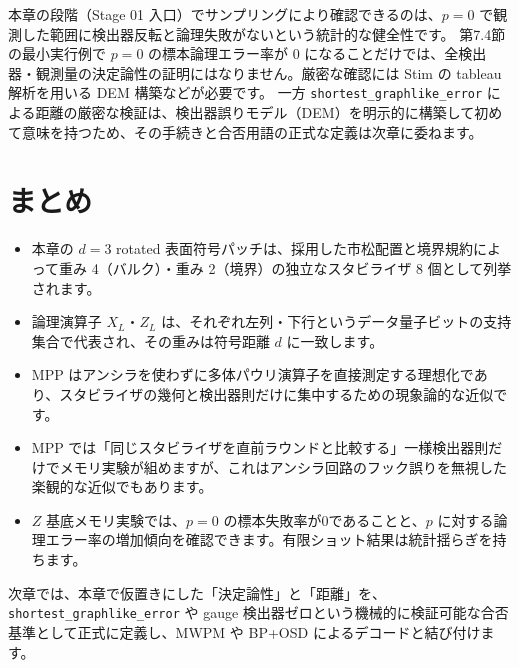 本章の段階（Stage 01 入口）でサンプリングにより確認できるのは、$p=0$ で観測した範囲に検出器反転と論理失敗がないという統計的な健全性です。
第7.4節の最小実行例で $p=0$ の標本論理エラー率が $0$ になることだけでは、全検出器・観測量の決定論性の証明にはなりません。厳密な確認には Stim の tableau 解析を用いる DEM 構築などが必要です\cite{gidney2021stim,stim2026python}。
一方 \texttt{shortest\_graphlike\_error} による距離の厳密な検証は、検出器誤りモデル（DEM）を明示的に構築して初めて意味を持つため、その手続きと合否用語の正式な定義は次章に委ねます。

\section{まとめ}\label{ch7:summary}

\begin{itemize}
  \item 本章の $d=3$ rotated 表面符号パッチは、採用した市松配置と境界規約によって重み 4（バルク）・重み 2（境界）の独立なスタビライザ 8 個として列挙されます。
  \item 論理演算子 $X_L$・$Z_L$ は、それぞれ左列・下行というデータ量子ビットの支持集合で代表され、その重みは符号距離 $d$ に一致します。
  \item MPP はアンシラを使わずに多体パウリ演算子を直接測定する理想化であり、スタビライザの幾何と検出器則だけに集中するための現象論的な近似です。
  \item MPP では「同じスタビライザを直前ラウンドと比較する」一様検出器則だけでメモリ実験が組めますが、これはアンシラ回路のフック誤りを無視した楽観的な近似でもあります。
  \item $Z$ 基底メモリ実験では、$p=0$ の標本失敗率が0であることと、$p$ に対する論理エラー率の増加傾向を確認できます。有限ショット結果は統計揺らぎを持ちます。
\end{itemize}

次章では、本章で仮置きにした「決定論性」と「距離」を、\texttt{shortest\_graphlike\_error} や gauge 検出器ゼロという機械的に検証可能な合否基準として正式に定義し、MWPM や BP+OSD によるデコードと結び付けます。

